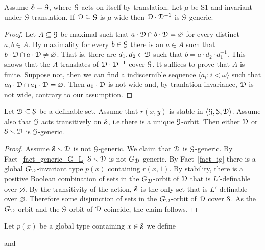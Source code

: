 \documentclass[creche.tex]{subfiles}
\begin{document}
\begin{fact}
  Assume $\S=\G$, where $\G$ acts on itself by translation. 
  Let $\mu$ be S1 and invariant under $\G$-translation.
  If $\D\subseteq\G$ is $\mu$-wide then $\D\cdot\D^{-1}$ is $\G$-generic.
\end{fact}

\begin{proof}
  Let $A\subseteq\G$ be maximal such that $a\cdot\D\cap b\cdot\D=\varnothing$ for every distinct $a,b \in A$.
  By maximality for every $b\in\G$ there is an $a\in A$ such that $b\cdot\D\cap a\cdot\D\neq\varnothing$.
  That is, there are $d_1,d_2\in\D$ such that $b=a\cdot d_2\cdot d_1^{-1}$.
  This shows that the $A$-translates of $\D\cdot\D^{-1}$ cover $\G$.
  It suffices to prove that $A$ is finite.
  Suppose not, then we can find a indiscernible sequence $\langle a_i:i<\omega\rangle$ such that $a_0\cdot\D\cap a_1\cdot\D=\varnothing$.
  Then $a_0\cdot\D$ is not wide and, by tranlation invariance, $\D$ is not wide, contrary to our assumption.
\end{proof}

\begin{theorem}
  Let $\D\subseteq\S$ be a definable set.
  Assume that $r(x,y)$ is stable in $\langle\G,\S,\D\rangle$.
  Assume also that $\G$ acts transitively on $\S$, i.e.\@ there is a unique $\G$-orbit.
  Then either $\D$ or $\S\smallsetminus\D$ is $\G$-generic.
\end{theorem}

\begin{proof}
  Assume $\S\smallsetminus\D$ is not $\G$-generic.
  We claim that $\D$ is $\G$-generic.
  By Fact~\ref{fact_generic_G_L} $\S\smallsetminus\D$ is not $G_{\D}$-generic.
  By Fact~\ref{fact_ig} there is a global $G_{\D}$-invariant type $p(x)$ containing $r(x,1)$.
  By stability, there is a positive Boolean combination of sets in the $G_{\D}$-orbit of $\D$ that is $L'$-definable over $\varnothing$.
  By the transitivity of the action, $\S$ is the only set that is $L'$-definable over $\varnothing$.
  Therefore some disjunction of sets in the $G_{\D}$-orbit of $\D$ cover $\S$.
  As the $G_{\D}$-orbit and the $\G$-orbit of $\D$ coincide, the claim follows.
\end{proof}

Let $p(x)$ be a global type containing $x\in\S$ we define


and

\end{document}
